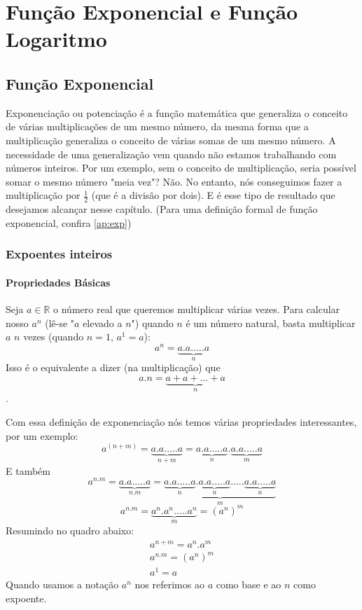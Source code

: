 \chapter{Função Exponencial e Função Logaritmo}
\section{Função Exponencial}

Exponenciação ou potenciação é a função matemática que generaliza o conceito de várias multiplicações de um mesmo número, da mesma forma que a multiplicação generaliza o conceito de várias somas de um mesmo número. A necessidade de uma generalização vem quando não estamos trabalhando com números inteiros. Por um exemplo, sem o conceito de multiplicação, seria possível somar o mesmo número "meia vez"? Não. No entanto, nós conseguimos fazer a multiplicação por $\frac{1}{2}$ (que é a divisão por dois). E é esse tipo de resultado que desejamos alcançar nesse capítulo.
(Para uma definição formal de função exponencial, confira \ref{ap:exp})

\subsection{Expoentes inteiros}
\subsubsection{Propriedades Básicas}
Seja $a\in \mathbb{R}$ o número real que queremos multiplicar várias vezes. Para calcular nosso $a^n$ (lê-se "$a$ elevado a $n$") quando $n$ é um número natural, basta multiplicar $a$ $n$ vezes (quando $n=1$, $a^1 = a$):
$$a^n = \underbrace{a.a.\ldots.a}_{n}$$
Isso é o equivalente a dizer (na multiplicação) que
$$a.n = \underbrace{a+a+\ldots+a}_{n}$$.

Com essa definição de exponenciação nós temos várias propriedades interessantes, por um exemplo:
$$a^{(n+m)}= \underbrace{a.a.\ldots.a}_{n+m} = \underbrace{a.a.\ldots.a}_{n}. \underbrace{a.a.\ldots.a}_{m}$$
E também
$$a^{n.m} = \underbrace{a.a.\ldots.a}_{n.m} = \underbrace{\underbrace{a.a.\ldots.a}_{n}.\underbrace{a.a.\ldots.a}_{n}.\ldots.\underbrace{a.a.\ldots.a}_{n}}_m$$
$$a^{n.m} = \underbrace{a^n . a^n . \ldots . a^n}_m = (a^n)^m$$
Resumindo no quadro abaixo:
\begin{eqnarray} \label{EXP1} a^{n+m} = a^n . a^m \\ \label{EXP2} a^{n.m} = (a^n)^m \\ \label{EXP3} a^1=a \end{eqnarray}
Quando usamos a notação $a^n$ nos referimos ao $a$ como base e ao $n$ como expoente.

